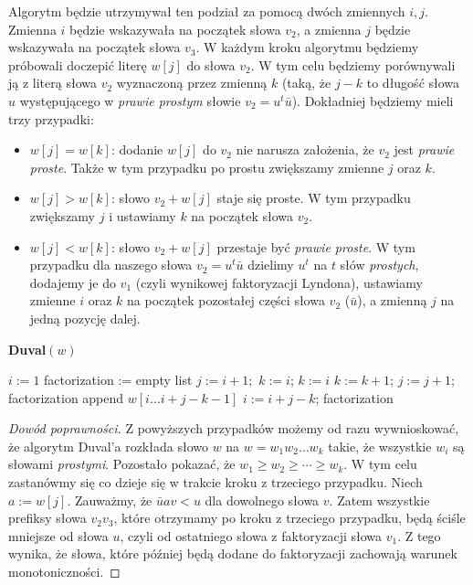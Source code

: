 \documentclass{article}
\begin{document}
Algorytm będzie utrzymywał ten podział za pomocą dwóch zmiennych $i, j$. Zmienna $i$ będzie wskazywała na początek słowa $v_2$, a zmienna $j$ będzie wskazywała na początek słowa $v_3$. 
W każdym kroku algorytmu będziemy próbowali doczepić literę $w[j]$ do słowa $v_2$. W tym celu będziemy porównywali ją z literą słowa $v_2$ wyznaczoną przez zmienną $k$ (taką, że $j - k$ 
to długość słowa $u$ występującego w \textit{prawie prostym} słowie $v_2 = u^t\bar{u}$). 
Dokładniej będziemy mieli trzy przypadki:
\begin{itemize}
    \item $w[j] = w[k]$: dodanie $w[j]$ do $v_2$ nie narusza założenia, że $v_2$ jest \textit{prawie proste}. Także w tym przypadku po prostu zwiększamy zmienne $j$ oraz $k$.
    \item $w[j] > w[k]$: słowo $v_2 + w[j]$ staje się proste. W tym przypadku zwiększamy $j$ i ustawiamy $k$ na początek słowa $v_2$.
    \item $w[j] < w[k]$: słowo $v_2 + w[j]$ przestaje być \textit{prawie proste}. W tym przypadku dla naszego słowa $v_2 = u^t\bar{u}$ dzielimy $u^t$ na $t$ słów \textit{prostych},
    dodajemy je do $v_1$ (czyli wynikowej faktoryzacji Lyndona), ustawiamy zmienne $i$ oraz $k$ na początek pozostałej części słowa $v_2$ ($\bar{u}$), a zmienną $j$ na jedną pozycję dalej.
\end{itemize}





\begin{algorithm}[H]
    \caption{\textbf{Duval$(w)$}}
    \begin{algorithmic}
        \State $i := 1$
        \State factorization := empty list
            \State $j := i+1;$  $k := i$;
                    \State $k := i$
                \Else
                    \State $k := k + 1$;
                \EndIf
                \State $j := j + 1$;
            \EndWhile
                \State factorization append $w[i\ldots i+j-k-1]$
                \State $i := i + j - k$;
           \EndWhile
        \EndWhile
        \State \Return factorization
    \end{algorithmic}
\end{algorithm}

\begin{proof}[Dowód poprawności]
    Z powyższych przypadków możemy od razu wywnioskować, że algorytm Duval'a rozkłada słowo $w$ na 
    $w = w_1w_2\ldots w_k$ takie, że wszystkie $w_i$ są słowami \textit{prostymi}.
    Pozostało pokazać, że $w_1 \geq w_2 \geq \cdots \geq w_k$. 
    W tym celu zastanówmy się co dzieje się w trakcie kroku z trzeciego przypadku. Niech $a := w[j]$. 
    Zauważmy, że $\bar{u}av < u$ dla 
    dowolnego słowa $v$. Zatem wszystkie prefiksy słowa $v_2v_3$, które otrzymamy po kroku z trzeciego przypadku,
    będą ściśle mniejsze od słowa $u$, czyli od ostatniego słowa z faktoryzacji słowa $v_1$. 
    Z tego wynika, że słowa, które później będą dodane do faktoryzacji zachowają warunek monotoniczności.
\end{proof}
\end{document}
